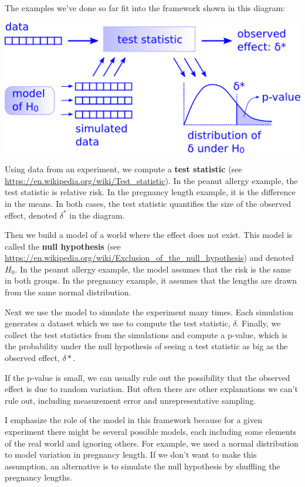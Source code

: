 The examples we've done so far fit into the framework shown in this
diagram:

\includegraphics{chapters/figs/hypothesis_testing.png}

Using data from an experiment, we compute a \textbf{test statistic} (see
\url{https://en.wikipedia.org/wiki/Test_statistic}). In the peanut
allergy example, the test statistic is relative risk. In the pregnancy
length example, it is the difference in the means. In both cases, the
test statistic quantifies the size of the observed effect, denoted
\(\delta^*\) in the diagram.

Then we build a model of a world where the effect does not exist. This
model is called the \textbf{null hypothesis} (see
\url{https://en.wikipedia.org/wiki/Exclusion_of_the_null_hypothesis})
and denoted \(H_0\). In the peanut allergy example, the model assumes
that the risk is the same in both groups. In the pregnancy example, it
assumes that the lengths are drawn from the same normal distribution.

Next we use the model to simulate the experiment many times. Each
simulation generates a dataset which we use to compute the test
statistic, \(\delta\). Finally, we collect the test statistics from the
simulations and compute a p-value, which is the probability under the
null hypothesis of seeing a test statistic as big as the observed
effect, \(\delta*\).

If the p-value is small, we can usually rule out the possibility that
the observed effect is due to random variation. But often there are
other explanations we can't rule out, including measurement error and
unrepresentative sampling.

I emphasize the role of the model in this framework because for a given
experiment there might be several possible models, each including some
elements of the real world and ignoring others. For example, we used a
normal distribution to model variation in pregnancy length. If we don't
want to make this assumption, an alternative is to simulate the null
hypothesis by shuffling the pregnancy lengths.

